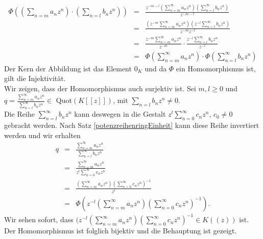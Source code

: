 {\begin{eqnarray*}
\Phi\left( \left( \sum_{n=m} a_nz^n \right)\cdot \left( \sum_{n=l} b_nz^n \right)\right)
&=&\frac{z^{-m-l}\left(\sum_{n=m}^{\infty}a_nz^n\right) \left(\sum_{n=l}^{\infty}b_nz^n\right)}{z^{-m-l}} \\ 
&=& \frac{\left(z^{-m}\sum_{n=m}^{\infty}a_n z^n\right)\left(z^{-l}\sum_{n=l}^{\infty}b_n z^n\right)}{z^{-m}z^{-l}}  \\
&=& \frac{z^{-m}\sum_{n=m}^{\infty}a_n z^n}{z^{-m}} \cdot \frac{z^{-l}\sum_{n=l}^{\infty}b_n z^n}{z^{-l}}\\
&=& \Phi \left(\sum_{n=m}^{\infty} a_nz^n\right) \cdot \Phi\left(\sum_{n=l}^{\infty} b_nz^n \right)
\end{eqnarray*}
Der Kern der Abbildung ist das Element $0_K$ und da $\Phi$ ein Homomorphismus ist, gilt die Injektivität.\\
Wir zeigen, dass der Homomorphismus auch surjektiv ist. Sei $m,l \geq 0$ und $q = \frac{{\sum_{n=m}^{\infty} a_nz^n}}{{\sum_{n=l}^{\infty} b_nz^n}} \in$ Quot$\left(K[[z]]\right)$, mit $\sum_{n=l} b_nz^n \neq 0$. \\
Die Reihe $\sum_{n = l}^{\infty} b_nz^n $ kann deswegen in die Gestalt $z^l\sum_{n = 0}^{\infty} c_nz^n $, $c_0 \neq 0$ gebracht werden. Nach Satz \ref{potenzreihenringEinheit} kann diese Reihe invertiert werden und wir erhalten
\begin{eqnarray*}
q &=& \frac{{\sum_{n=m}^{\infty} a_nz^n}}{{\sum_{n=l}^{\infty} b_nz^n}} \\
&=& \frac{{\sum_{n=m}^{\infty} a_nz^n}}{z^l\sum_{n = 0}^{\infty} c_nz^n } \\
&=& \frac{\left(\sum_{n = m}^{\infty} a_nz^n\right)\left( \sum_{n = 0}^{\infty} c_nz^n\right)^{-1}}{{z^l}}\\
&=& \Phi\left(z^{-l}\left(\sum_{n = m}^{\infty} a_nz^n\right)\left(\sum_{n = 0}^{\infty} c_nz^n\right)^{-1}\right).
\end{eqnarray*}
%
Wir sehen sofort, dass $(z^{-l}\left(\sum_{n = m}^{\infty} a_nz^n\right)\left(\sum_{n = 0}^{\infty} c_nz^n\right)^{-1} \in K((z))$ ist. Der Homomorphismus ist folglich bijektiv und die Behauptung ist gezeigt. 
}
%
%

